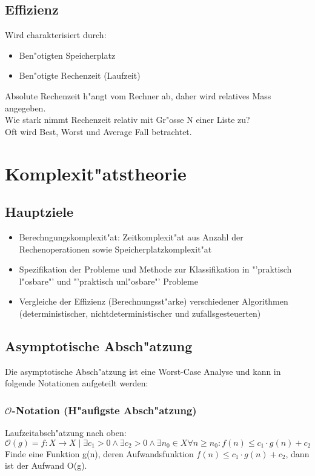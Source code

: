\subsection{Effizienz}
Wird charakterisiert durch: 
\begin{itemize}
\item Ben"otigten Speicherplatz
\item Ben"otigte Rechenzeit (Laufzeit)
\end{itemize}
Absolute Rechenzeit h"angt vom Rechner ab, daher wird relatives Mass angegeben. \\
Wie stark nimmt Rechenzeit relativ mit Gr"osse N einer Liste zu? \\
Oft wird Best, Worst und Average Fall betrachtet.



\section{Komplexit"atstheorie}
\subsection{Hauptziele}
\begin{itemize}
\item Berechngungskomplexit"at: Zeitkomplexit"at aus Anzahl der Rechenoperationen sowie Speicherplatzkomplexit"at
\item Spezifikation der Probleme und Methode zur Klassifikation in "'praktisch l"osbare"' und "'praktisch unl"osbare"' Probleme
\item Vergleiche der Effizienz (Berechnungsst"arke) verschiedener Algorithmen (deterministischer, nichtdeterministischer und zufallsgesteuerten)
\end{itemize}
\subsection{Asymptotische Absch"atzung}
Die asymptotische Absch"atzung ist eine Worst-Case Analyse und kann in folgende Notationen aufgeteilt werden:

\subsubsection{$\mathcal{O}$-Notation (H"aufigste Absch"atzung)}
Laufzeitabsch"atzung nach oben:
\begin{equation}
	\mathcal{O}(g) = {f: X \rightarrow X \mid \exists c_1>0 \wedge \exists c_2>0 \wedge \exists n_0 \in X  \forall n \geq n_0 : f(n) \leq c_1\cdot g(n) + c_2}
\end{equation}
Finde eine Funktion g(n), deren Aufwandsfunktion $f(n) \leq c_1 \cdot g(n) + c_2$, dann ist der Aufwand O(g).

